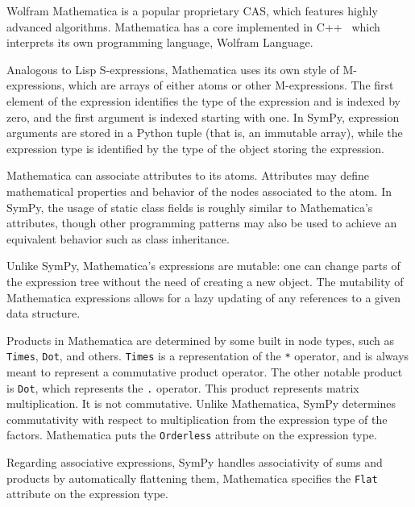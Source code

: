 
Wolfram Mathematica is a popular proprietary CAS\@,
which features highly advanced algorithms.
Mathematica has a core implemented in C++~\cite{Wolfram2003book}
which interprets its own programming language, Wolfram Language.


Analogous to Lisp S-expressions,
Mathematica uses its own style of M-expres\-sions,
which are arrays of either atoms or other M-expressions.
The first element of the expression identifies the type of the expression
and is indexed by zero, and the first argument is indexed starting with one.
In SymPy, expression arguments are stored in a Python tuple
(that is, an immutable array),
while the expression type is identified by the type of the object storing the
expression.


Mathematica can associate attributes to its atoms.
Attributes may define mathematical properties and behavior of the nodes
associated to the atom.
In SymPy, the usage of static class fields is roughly similar to Mathematica's
attributes, though other programming patterns may also be used to achieve an
equivalent behavior such as class inheritance.


Unlike SymPy, Mathematica's expressions are mutable:
one can change parts of the expression tree without the need of
creating a new object.
The mutability of Mathematica expressions allows for a lazy updating of any references
to a given data structure.


Products in Mathematica are determined by some built in node types, such as
\texttt{Times}, \texttt{Dot}, and others.  \texttt{Times} is a representation of
the \texttt{*} operator, and is always meant to represent a commutative product
operator.  The other notable product is \texttt{Dot}, which represents the
\texttt{.} operator.  This product represents matrix multiplication. It is not
commutative.  Unlike
Mathematica, SymPy determines commutativity with respect to multiplication from
the expression type of the factors.  Mathematica puts the \texttt{Orderless} attribute
on the expression type.


Regarding associative expressions,
SymPy handles associativity of sums and products by automatically flattening them,
Mathematica specifies the \texttt{Flat} attribute on the expression type.

